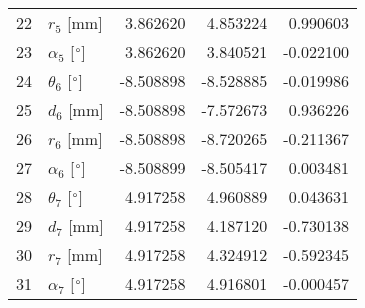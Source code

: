 \documentclass{standalone}%
\begin{document}
\begin{tabular}{llrrr}
22 &              $r_{5}$ [mm] &  3.862620 &   4.853224 &   0.990603 \\
23 &  $\alpha_{5}$ [$\degree$] &  3.862620 &   3.840521 &  -0.022100 \\
24 &  $\theta_{6}$ [$\degree$] & -8.508898 &  -8.528885 &  -0.019986 \\
25 &              $d_{6}$ [mm] & -8.508898 &  -7.572673 &   0.936226 \\
26 &              $r_{6}$ [mm] & -8.508898 &  -8.720265 &  -0.211367 \\
27 &  $\alpha_{6}$ [$\degree$] & -8.508899 &  -8.505417 &   0.003481 \\
28 &  $\theta_{7}$ [$\degree$] &  4.917258 &   4.960889 &   0.043631 \\
29 &              $d_{7}$ [mm] &  4.917258 &   4.187120 &  -0.730138 \\
30 &              $r_{7}$ [mm] &  4.917258 &   4.324912 &  -0.592345 \\
31 &  $\alpha_{7}$ [$\degree$] &  4.917258 &   4.916801 &  -0.000457 \\
\bottomrule
\end{tabular}
%
\end{document}
